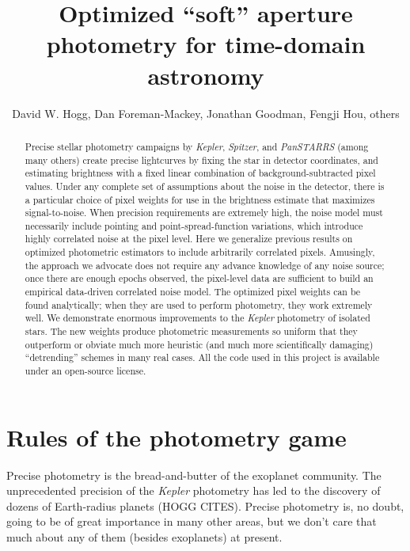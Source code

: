 \documentclass[12pt, letterpaper, preprint]{aastex}
\newcommand{\project}[1]{\textsl{#1}}
\begin{document}
\title{
  Optimized ``soft'' aperture photometry for time-domain astronomy
}
\author{
  David W. Hogg,
  Dan Foreman-Mackey,
  Jonathan Goodman,
  Fengji Hou,
  others
}

\begin{abstract}
Precise stellar photometry campaigns by \project{Kepler}, \project{Spitzer}, and \project{PanSTARRS}
  (among many others)
  create precise lightcurves by fixing the star in detector coordinates,
  and estimating brightness with a fixed linear combination of background-subtracted pixel values.
Under any complete set of assumptions about the noise in the detector,
  there is a particular choice of pixel weights for use in the brightness estimate
  that maximizes signal-to-noise.
When precision requirements are extremely high,
  the noise model must necessarily include pointing and point-spread-function variations,
  which introduce highly correlated noise at the pixel level.
Here we generalize previous results on optimized photometric estimators
  to include arbitrarily correlated pixels.
Amusingly, the approach we advocate does not require any advance knowledge of any noise source;
  once there are enough epochs observed,
  the pixel-level data are sufficient to build an empirical data-driven correlated noise model.
The optimized pixel weights can be found analytically;
  when they are used to perform photometry, they work extremely well.
We demonstrate enormous improvements to the \project{Kepler} photometry of isolated stars.
The new weights produce photometric measurements so uniform that
  they outperform or obviate much more heuristic (and much more scientifically damaging)
  ``detrending'' schemes in many real cases.
All the code used in this project is available under an open-source license.
\end{abstract}


\section{Rules of the photometry game}

Precise photometry is the bread-and-butter of the exoplanet community.
The unprecedented precision of the \project{Kepler} photometry has led to the discovery of
dozens of Earth-radius planets (HOGG CITES).
Precise photometry is, no doubt, going to be of great importance in many other areas,
  but we don't care that much about any of them (besides exoplanets) at present.
\end{document}
